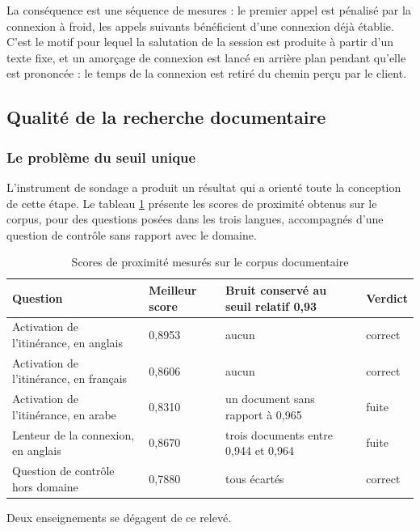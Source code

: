 La conséquence est une séquence de mesures : le premier appel est pénalisé par la connexion à froid, les appels suivants bénéficient d'une connexion déjà établie. C'est le motif pour lequel la salutation de la session est produite à partir d'un texte fixe, et un amorçage de connexion est lancé en arrière plan pendant qu'elle est prononcée : le temps de la connexion est retiré du chemin perçu par le client.

\subsection{Qualité de la recherche documentaire}

\subsubsection{Le problème du seuil unique}

L'instrument de sondage a produit un résultat qui a orienté toute la conception de cette étape. Le tableau \ref{tab:rag-mesures} présente les scores de proximité obtenus sur le corpus, pour des questions posées dans les trois langues, accompagnés d'une question de contrôle sans rapport avec le domaine.

\begin{table}[H]
\centering
\renewcommand{\arraystretch}{1.25}
\begin{tabular}{|p{5.4cm}|p{2.1cm}|p{3.4cm}|p{3.0cm}|}
\hline
\textbf{Question} & \textbf{Meilleur score} & \textbf{Bruit conservé au seuil relatif 0,93} & \textbf{Verdict} \\
\hline
Activation de l'itinérance, en anglais & 0,8953 & aucun & correct \\
\hline
Activation de l'itinérance, en français & 0,8606 & aucun & correct \\
\hline
Activation de l'itinérance, en arabe & 0,8310 & un document sans rapport à 0,965 & fuite \\
\hline
Lenteur de la connexion, en anglais & 0,8670 & trois documents entre 0,944 et 0,964 & fuite \\
\hline
Question de contrôle hors domaine & 0,7880 & tous écartés & correct \\
\hline
\end{tabular}
\caption{Scores de proximité mesurés sur le corpus documentaire}
\label{tab:rag-mesures}
\end{table}

Deux enseignements se dégagent de ce relevé.

